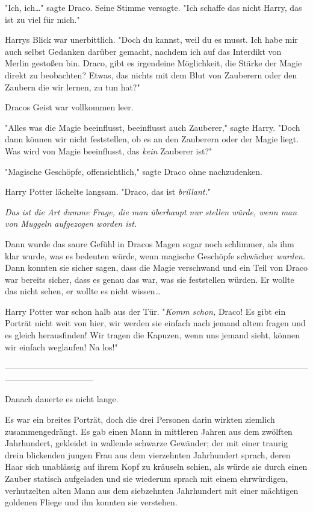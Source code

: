 {"Ich, ich…" sagte Draco. Seine Stimme versagte. "Ich schaffe das nicht Harry, das ist zu viel für mich."

Harrys Blick war unerbittlich. "Doch du kannst, weil du es musst. Ich habe mir auch selbst Gedanken darüber gemacht, nachdem ich auf das Interdikt von Merlin gestoßen bin. Draco, gibt es irgendeine Möglichkeit, die Stärke der Magie direkt zu beobachten? Etwas, das nichts mit dem Blut von Zauberern oder den Zaubern die wir lernen, zu tun hat?"

Dracos Geist war vollkommen leer.

"Alles was die Magie beeinflusst, beeinflusst auch Zauberer," sagte Harry. "Doch dann können wir nicht feststellen, ob es an den Zauberern oder der Magie liegt. Was wird von Magie beeinflusst, das \emph{kein} Zauberer ist?"

"Magische Geschöpfe, offensichtlich," sagte Draco ohne nachzudenken.

Harry Potter lächelte langsam. "Draco, das ist \emph{brillant.}"

\emph{Das ist die Art dumme Frage, die man überhaupt nur stellen würde, wenn man von Muggeln aufgezogen worden ist.}

Dann wurde das saure Gefühl in Dracos Magen sogar noch schlimmer, als ihm klar wurde, was es bedeuten würde, wenn magische Geschöpfe schwächer \emph{wurden.} Dann konnten sie sicher sagen, dass die Magie verschwand und ein Teil von Draco war bereits sicher, dass es genau das war, was sie feststellen würden. Er wollte das nicht sehen, er wollte es nicht wissen…

Harry Potter war schon halb aus der Tür. "\emph{Komm schon,} Draco! Es gibt ein Porträt nicht weit von hier, wir werden sie einfach nach jemand altem fragen und es gleich herausfinden! Wir tragen die Kapuzen, wenn uns jemand sieht, können wir einfach weglaufen! Na los!"

--------------------------------------------------------------------------------------------------------------------------------------------

Danach dauerte es nicht lange.

Es war ein breites Porträt, doch die drei Personen darin wirkten ziemlich zusammengedrängt. Es gab einen Mann in mittleren Jahren aus dem zwölften Jahrhundert, gekleidet in wallende schwarze Gewänder; der mit einer traurig drein blickenden jungen Frau aus dem vierzehnten Jahrhundert sprach, deren Haar sich unablässig auf ihrem Kopf zu kräuseln schien, als würde sie durch einen Zauber statisch aufgeladen und sie wiederum sprach mit einem ehrwürdigen, verhutzelten alten Mann aus dem siebzehnten Jahrhundert mit einer mächtigen goldenen Fliege und ihn konnten sie verstehen.

}
